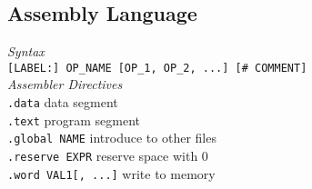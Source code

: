 \subsection*{Assembly Language}
\emph{Syntax}\\
\texttt{[LABEL:] OP\_NAME [OP\_1, OP\_2, ...] [\# COMMENT]}\\
\emph{Assembler Directives}\\
\texttt{.data} \hfill data segment\\
\texttt{.text} \hfill program segment\\
\texttt{.global NAME} \hfill introduce to other files\\
\texttt{.reserve EXPR} \hfill reserve space with 0\\
\texttt{.word VAL1[, ...]} \hfill write to memory\\